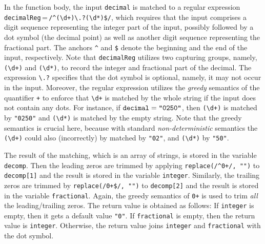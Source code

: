 In the function body, the input {\tt decimal} %
is matched to a regular expression {\tt decimalReg}\,=\,{\tt /\^{}({\footnotesize\textbackslash}d+){\footnotesize\textbackslash}.?({\footnotesize\textbackslash}d*)\$/}, which requires that  the input comprises a digit sequence representing the integer part of the input, possibly followed by a dot symbol (the decimal point) as well as another digit sequence representing the fractional part. The anchors  \verb!^! and \verb!$! denote the beginning and the end of the input, respectively. Note that  {\tt decimalReg} utilizes two capturing groups, namely, {\tt ({\footnotesize\textbackslash}d+)} and {\tt ({\footnotesize\textbackslash}d*)}, to record the integer and fractional part of the decimal. The expression {\tt {\footnotesize\textbackslash}.?} specifies that the dot symbol is optional, namely, it may not occur in the input. Moreover,  the regular expression utilizes the \emph{greedy} semantics of the quantifier {\tt +} to enforce that {\tt {\footnotesize\textbackslash}d+} is matched by the whole string if the input does not contain any dots. For instance, if ${\tt decimal} = \texttt{"0250"}$, then {\tt ({\footnotesize\textbackslash}d+)} is matched by \texttt{"0250"} and  {\tt ({\footnotesize\textbackslash}d*)} is matched by the empty string. 
Note that the greedy semantics is crucial here, because with standard \emph{non-deterministic} semantics the {\tt ({\footnotesize\textbackslash}d+)} could also (incorrectly) by matched by \texttt{"02"}, and {\tt ({\footnotesize\textbackslash}d*)} by \texttt{"50"}.

  The result of the matching, which is an array of strings, is stored in the variable {\tt decomp}. 
%
Then the leading zeros are trimmed by applying {\tt replace(/\^{}0+/, "")} to {\tt decomp[1]} and the result is stored in the variable {\tt integer}. Similarly, the trailing zeros are trimmed by {\tt replace(/{}0+\$/, "")} to {\tt decomp[2]} and the result is stored in the variable {\tt fractional}. Again, the greedy semantics of {\tt 0+} is used to trim \emph{all} the leading/trailing zeros.
%
The return value is obtained as follows: If {\tt integer} is empty, then it gets a default value \texttt{"0"}. If {\tt fractional} is empty, then the return value is {\tt integer}. Otherwise, the return value  joins {\tt integer} and {\tt fractional} with the dot symbol. 

